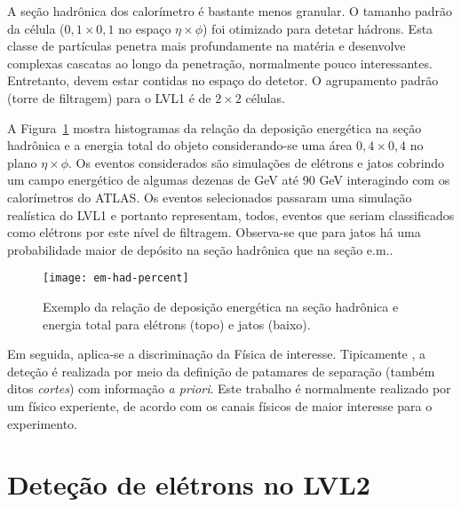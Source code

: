 A seção hadrônica dos calorímetro é bastante menos granular. O tamanho padrão
da célula ($0,1\times0,1$ no espaço $\eta\times\phi$) foi otimizado para
detetar hádrons. Esta classe de partículas penetra mais profundamente na
matéria e desenvolve complexas cascatas ao longo da penetração, normalmente
pouco interessantes. Entretanto, devem estar contidas no espaço do detetor. O
agrupamento padrão (torre de filtragem) para o LVL1 é de $2\times2$ células.

A Figura~\ref{fig:e-jet-deposit} mostra histogramas da relação da deposição
energética na seção hadrônica e a energia total do objeto considerando-se uma
área $0,4\times0,4$ no plano $\eta\times\phi$. Os eventos considerados são
simulações de elétrons e jatos cobrindo um campo energético de algumas dezenas
de GeV até 90 GeV interagindo com os calorímetros do ATLAS. Os eventos
selecionados passaram uma simulação realística do LVL1 e portanto representam,
todos, eventos que seriam classificados como elétrons por este nível de
filtragem. Observa-se que para jatos há uma probabilidade maior de depósito na
seção hadrônica que na seção e.m..

\begin{figure}
\begin{center}
\texttt{[image: em-had-percent]}
\end{center}
\caption{Exemplo da relação de deposição energética na seção hadrônica e
energia total para elétrons (topo) e jatos (baixo).}
\label{fig:e-jet-deposit}
\end{figure}

Em seguida, aplica-se a discriminação da Física de interesse. Tipicamente
\cite{nevski-calor-1992, guida-calor-1992, palutan-calor-2000}, a deteção é
realizada por meio da definição de patamares de separação (também ditos
\emph{cortes}) com informação \emph{a priori}. Este trabalho é normalmente
realizado por um físico experiente, de acordo com os canais físicos de maior
interesse para o experimento.


\section{Deteção de elétrons no LVL2}
\label{sec:lvl2-detect-electron}

